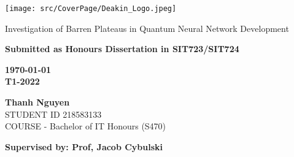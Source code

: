 \thispagestyle{empty}
\begin{titlepage}
    \texttt{[image: src/CoverPage/Deakin\_Logo.jpeg]}
    \begin{center}
        \vspace*{4cm}
        {\LARGE Investigation of Barren Plateaus in Quantum Neural Network Development}
        \vspace{3cm}
        \begin{large}


            \bf Submitted as Honours Dissertation in SIT723/SIT724
            \vspace{1cm}

            \bf \today \\
            T1-2022

            \vspace{3cm}
            \textbf{Thanh Nguyen}\\
            STUDENT ID 218583133 \\
            COURSE - Bachelor of IT Honours (S470)
            \vfill

            \bf \normalsize Supervised by: Prof, Jacob Cybulski\\

        \end{large}
    \end{center}
\end{titlepage}
